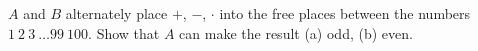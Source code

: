 $A$ and $B$ alternately place $+$, $-$, $\cdot$ into the free places between the numbers $1\ 2\ 3\ \ldots 99\ 100$. Show that $A$ can make the result (a) odd, (b) even.
